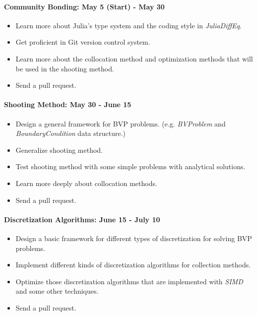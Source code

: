 \documentclass[a4paper,12pt,onecolumn]{article}
\begin{document}
\paragraph{Community Bonding: May 5 (Start) - May 30} %
\label{par:community_bonding}
\begin{itemize}
	\item Learn more about Julia's type system and the coding style in \textit{JuliaDiffEq}.
	\item Get proficient in Git version control system.
	\item Learn more about the collocation method and optimization methods that will be
	used in the shooting method.
	\item Send a pull request.
\end{itemize}

\paragraph{Shooting Method: May 30 - June 15} %
\label{par:shooting_method_may_30_june_15}
\begin{itemize}
	\item Design a general framework for BVP problems. (e.g. \textit{BVProblem} and \textit{
	BoundaryCondition} data structure.)
	\item Generalize shooting method.
	\item Test shooting method with some simple problems with analytical solutions.
	\item Learn more deeply about collocation methods.
	\item Send a pull request.
\end{itemize}

\paragraph{Discretization Algorithms: June 15 - July 10} %
\label{par:discretization_algorithms}
\begin{itemize}
	\item Design a basic framework for different types of discretization for solving
	BVP problems.
	\item Implement different kinds of discretization algorithms for collection methods.
	\item Optimize those discretization algorithms that are implemented with \textit{SIMD}
	and some other techniques.
	\item Send a pull request.
\end{itemize}
\end{document}
